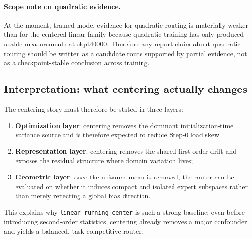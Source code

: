 \documentclass[11pt]{article}
\begin{document}
\paragraph{Scope note on quadratic evidence.} At the moment, trained-model evidence for quadratic routing is materially weaker than for the centered linear family because quadratic training has only produced usable measurements at ckpt40000. Therefore any report claim about quadratic routing should be written as a candidate route supported by partial evidence, not as a checkpoint-stable conclusion across training.

\subsection{Interpretation: what centering actually changes}
The centering story must therefore be stated in three layers:
\begin{enumerate}
    \item \textbf{Optimization layer}: centering removes the dominant initialization-time variance source and is therefore expected to reduce Step-0 load skew;
    \item \textbf{Representation layer}: centering removes the shared first-order drift and exposes the residual structure where domain variation lives;
    \item \textbf{Geometric layer}: once the nuisance mean is removed, the router can be evaluated on whether it induces compact and isolated expert subspaces rather than merely reflecting a global bias direction.
\end{enumerate}
This explains why \texttt{linear\_running\_center} is such a strong baseline: even before introducing second-order statistics, centering already removes a major confounder and yields a balanced, task-competitive router.
\end{document}
